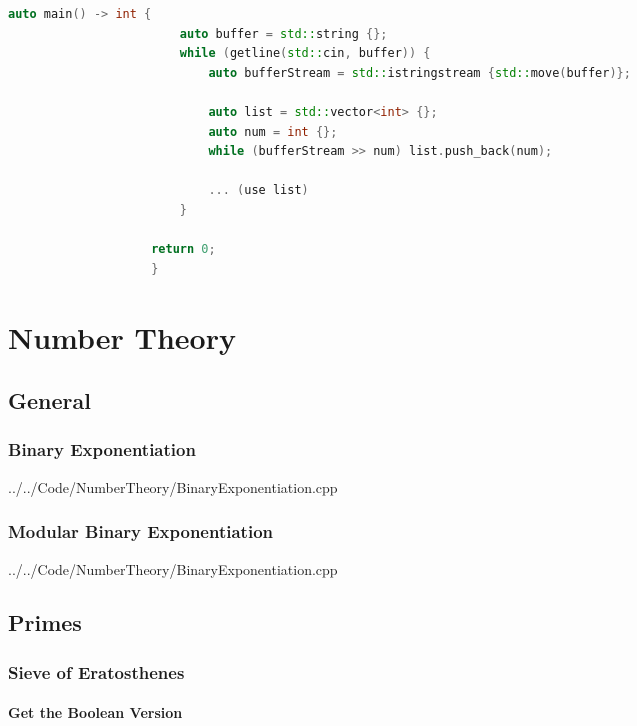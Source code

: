 \documentclass[11pt, fleqn]{report}                             %
\theoremstyle{break}                                            %
\begin{document}
\begin{multicols}{2}
\begin{lstlisting}[language=C++, gobble=20]
                    auto main() -> int {
                        auto buffer = std::string {};
                        while (getline(std::cin, buffer)) {
                            auto bufferStream = std::istringstream {std::move(buffer)};
                            
                            auto list = std::vector<int> {};
                            auto num = int {};
                            while (bufferStream >> num) list.push_back(num);

                            ... (use list)
                        }
                        
                    return 0;
                    }
                \end{lstlisting}

\part{Number Theory}

    \chapter{General}

        \section{Binary Exponentiation}
            
            {../../Code/NumberTheory/BinaryExponentiation.cpp}

        \vfill\null
        \columnbreak

        \section{Modular Binary Exponentiation}
            
            {../../Code/NumberTheory/BinaryExponentiation.cpp}


    \chapter{Primes}
    
        \section{Sieve of Eratosthenes}

            \subsection{Get the Boolean Version}


\end{multicols}
\end{document}
